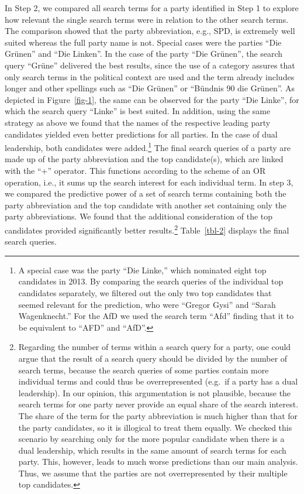\documentclass[
  letterpaper,
  DIV=11,
  numbers=noendperiod]{scrartcl}
\begin{document}
In Step 2, we compared all search terms for a party identified in Step 1
to explore how relevant the single search terms were in relation to the
other search terms. The comparison showed that the party abbreviation,
e.g., SPD, is extremely well suited whereas the full party name is not.
Special cases were the parties ``Die Grünen'' and ``Die Linken''. In the
case of the party ``Die Grünen'', the search query ``Grüne'' delivered
the best results, since the use of a category assures that only search
terms in the political context are used and the term already includes
longer and other spellings such as ``Die Grünen'' or ``Bündnis 90 die
Grünen''. As depicted in Figure~\ref{fig-1}, the same can be observed
for the party ``Die Linke'', for which the search query ``Linke'' is
best suited. In addition, using the same strategy as above we found that
the names of the respective leading party candidates yielded even better
predictions for all parties. In the case of dual leadership, both
candidates were added.\footnote{A special case was the party ``Die
  Linke,'' which nominated eight top candidates in 2013. By comparing
  the search queries of the individual top candidates separately, we
  ﬁltered out the only two top candidates that seemed relevant for the
  prediction, who were ``Gregor Gysi'' and ``Sarah Wagenknecht.'' For
  the AfD we used the search term ``Afd'' finding that it to be
  equivalent to ``AFD'' and ``AfD''.} The ﬁnal search queries of a party
are made up of the party abbreviation and the top candidate(s), which
are linked with the ``+'' operator. This functions according to the
scheme of an OR operation, i.e., it sums up the search interest for each
individual term. In step 3, we compared the predictive power of a set of
search terms containing both the party abbreviation and the top
candidate with another set containing only the party abbreviations. We
found that the additional consideration of the top candidates provided
signiﬁcantly better results.\footnote{Regarding the number of terms
  within a search query for a party, one could argue that the result of
  a search query should be divided by the number of search terms,
  because the search queries of some parties contain more individual
  terms and could thus be overrepresented (e.g.~if a party has a dual
  leadership). In our opinion, this argumentation is not plausible,
  because the search terms for one party never provide an equal share of
  the search interest. The share of the term for the party abbreviation
  is much higher than that for the party candidates, so it is illogical
  to treat them equally. We checked this scenario by searching only for
  the more popular candidate when there is a dual leadership, which
  results in the same amount of search terms for each party. This,
  however, leads to much worse predictions than our main analysis. Thus,
  we assume that the parties are not overrepresented by their multiple
  top candidates.} Table~\ref{tbl-2} displays the final search queries.
\end{document}
